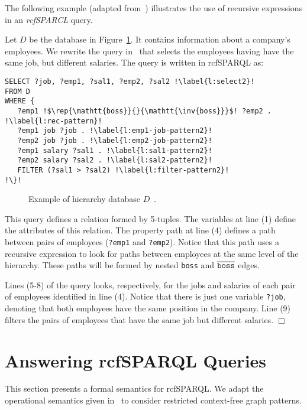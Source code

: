 \documentclass[runningheads]{llncs}
\begin{document}
The following example (adapted from~\cite{MEDEIROS201975}) illustrates the use of recursive expressions in an \textsl{rcfSPARCL} query. 

\begin{example} \label{ex}
Let $D$ be the database in Figure~\ref{fig:ex-employees}.
It contains information about a company's employees.
We rewrite the query in~\cite{MEDEIROS2019} that selects the employees having have the same job, but different salaries.
The query is written in \textsf{rcfSPARQL} as:
\begin{lstlisting}
SELECT ?job, ?emp1, ?sal1, ?emp2, ?sal2 !\label{l:select2}!
FROM D
WHERE {
   ?emp1 !$\rep{\mathtt{boss}}{}{\mathtt{\inv{boss}}}$! ?emp2 . !\label{l:rec-pattern}!
   ?emp1 job ?job . !\label{l:emp1-job-pattern2}!
   ?emp2 job ?job . !\label{l:emp2-job-pattern2}!
   ?emp1 salary ?sal1 . !\label{l:sal1-pattern2}!
   ?emp2 salary ?sal2 . !\label{l:sal2-pattern2}!
   FILTER (?sal1 > ?sal2) !\label{l:filter-pattern2}!
!\}!
    \end{lstlisting}

\begin{figure}[htb]
    \centering
    
\caption{Example of hierarchy database $D$~\cite{MEDEIROS2019}.}
\label{fig:ex-employees}
\end{figure}
This query defines a relation formed by 5-tuples.
The variables at line (1) define the attributes of this relation.
The property path at line (4) defines a path between pairs of employees (\texttt{?emp1} and \texttt{?emp2}).
Notice that this path uses a recursive expression to look for paths between employees at the same level of the hierarchy.
These paths will be formed by nested \texttt{boss} and $\mathtt{\overline{boss}}$ edges.

Lines (5-8) of the query looks, respectively, for the jobs and salaries of each pair of employees identified in line (4).
Notice that there is just one variable \texttt{?job}, denoting that both employees have the same position in the company.
Line (9) filters the pairs of employees that have the same job but different salaries.
\hfill$\Box$
\end{example}

\section{Answering \textsf{rcfSPARQL} Queries}
\label{sec:semantics}

This section presents a formal semantics for \textsf{rcfSPARQL}.
We adapt the operational semantics given in~\cite{MEDEIROS2019} to consider restricted context-free graph patterns.
\end{document}
